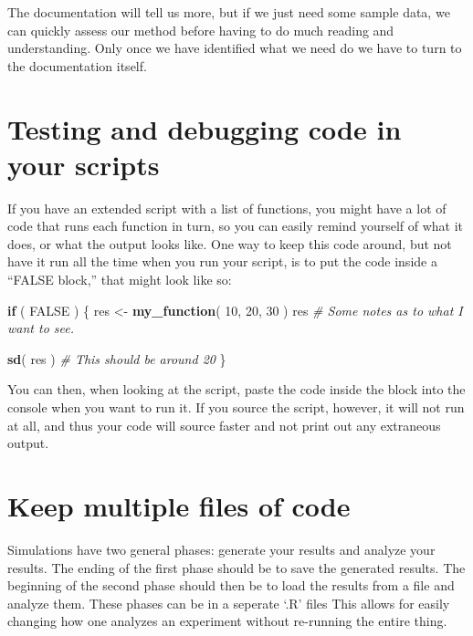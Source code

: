 \documentclass[
]{book}
\newenvironment{Shaded}{\begin{snugshade}}{\end{snugshade}}
\newcommand{\CommentTok}[1]{\textcolor[rgb]{0.56,0.35,0.01}{\textit{#1}}}
\newcommand{\ConstantTok}[1]{\textcolor[rgb]{0.56,0.35,0.01}{#1}}
\newcommand{\ControlFlowTok}[1]{\textcolor[rgb]{0.13,0.29,0.53}{\textbf{#1}}}
\newcommand{\DecValTok}[1]{\textcolor[rgb]{0.00,0.00,0.81}{#1}}
\newcommand{\FunctionTok}[1]{\textcolor[rgb]{0.13,0.29,0.53}{\textbf{#1}}}
\newcommand{\NormalTok}[1]{#1}
\newcommand{\OtherTok}[1]{\textcolor[rgb]{0.56,0.35,0.01}{#1}}
\begin{document}
The documentation will tell us more, but if we just need some sample data, we can quickly assess our method before having to do much reading and understanding.
Only once we have identified what we need do we have to turn to the documentation itself.

\section{Testing and debugging code in your scripts}\label{testing-and-debugging-code-in-your-scripts}

If you have an extended script with a list of functions, you might have a lot of code that runs each function in turn, so you can easily remind yourself of what it does, or what the output looks like.
One way to keep this code around, but not have it run all the time when you run your script, is to put the code inside a ``FALSE block,'' that might look like so:

\begin{Shaded}
\begin{Highlighting}[]
\ControlFlowTok{if}\NormalTok{ ( }\ConstantTok{FALSE}\NormalTok{ ) \{}
\NormalTok{  res }\OtherTok{\textless{}{-}} \FunctionTok{my\_function}\NormalTok{( }\DecValTok{10}\NormalTok{, }\DecValTok{20}\NormalTok{, }\DecValTok{30}\NormalTok{ )}
\NormalTok{  res}
  \CommentTok{\# Some notes as to what I want to see.}
  
  \FunctionTok{sd}\NormalTok{( res )}
  \CommentTok{\# This should be around 20}
\NormalTok{\}}
\end{Highlighting}
\end{Shaded}

You can then, when looking at the script, paste the code inside the block into the console when you want to run it.
If you source the script, however, it will not run at all, and thus your code will source faster and not print out any extraneous output.

\section{Keep multiple files of code}\label{keep-multiple-files-of-code}

Simulations have two general phases: generate your results and analyze your results.
The ending of the first phase should be to save the generated results.
The beginning of the second phase should then be to load the results from a file and analyze them.
These phases can be in a seperate `.R' files
This allows for easily changing how one analyzes an experiment
without re-running the entire thing.
\end{document}
